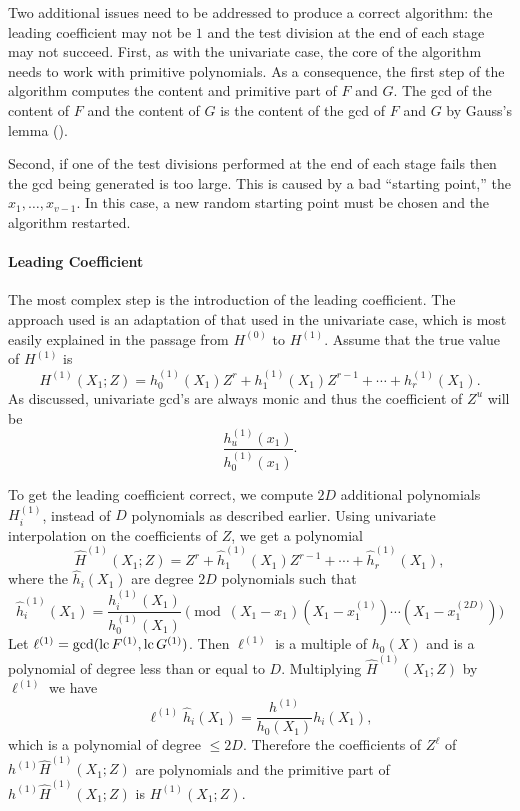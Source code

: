 \medskip
Two additional issues need to be addressed to produce a correct
algorithm: the leading coefficient may not be $1$ and the test
division at the end of each stage may not succeed.  First, as with the
univariate case, the core of the algorithm needs to work with
primitive polynomials.  As a consequence, the first step of the
algorithm computes the content and primitive part of $F$ and $G$.
The {\sc gcd} of the content of $F$ and the content of $G$ is the
content of the {\sc gcd} of $F$ and $G$ by Gauss's lemma
(). 

Second, if one of the test divisions performed at the end of each
stage fails then the {\sc gcd} being generated is too large.  This is
caused by a bad ``starting point,'' the $x_1, \ldots, x_{v-1}$.  In
this case, a new random starting point must be chosen and the algorithm
restarted.  

\paragraph{Leading Coefficient}

The most complex step is the introduction of the leading coefficient.
The approach used is an adaptation of that used in the univariate
case, which is most easily explained in the passage from $H^{(0)}$ to
$H^{(1)}$.  Assume that the true value of $H^{(1)}$ is
\[
H^{(1)}(X_1; Z) = h^{(1)}_0(X_1) Z^r + h^{(1)}_1(X_1) Z^{r-1} + 
  \cdots + h^{(1)}_r(X_1).
\]
As discussed, univariate {\sc gcd}'s are always monic and thus the
coefficient of $Z^u$ will be  
\[
\frac{h^{(1)}_{u}(x_1)}{h^{(1)}_0(x_1)}.
\]

To get the leading coefficient correct, we compute $2D$
additional polynomials $H^{(1)}_i$, instead of $D$ polynomials as
described earlier.  Using univariate interpolation on the coefficients
of $Z$, we get a polynomial
\[
\hat{H}^{(1)}(X_1; Z) = Z^r + \hat{h}^{(1)}_1(X_1)Z^{r-1} + \cdots +
\hat{h}^{(1)}_r(X_1),
\]
where the $\hat{h}_i(X_1)$ are degree $2D$ polynomials such that 
\[
\hat{h}^{(1)}_i(X_1) = \frac{h^{(1)}_i(X_1)}{h^{(1)}_0(X_1)} 
  \pmod{(X_1 - x_1)(X_1 - x^{(1)}_1) \cdots (X_1 - x^{(2D)}_1)}
\]
Let $\ell^{(1)} = \gcd(\operatorname{lc} F^{(1)}, \operatorname{lc} G^{(1)})$.  Then $\ell^{(1)}$ is a
multiple of $h_0(X)$ and is a polynomial of degree less than or equal
to $D$.  Multiplying $\hat{H}^{(1)}(X_1; Z)$ by $\ell^{(1)}$ we have
\[
\ell^{(1)} \hat{h}_i(X_1) = \frac{h^{(1)}}{h_0(X_1)} h_i(X_1),
\]
which is a polynomial of degree $\le 2D$.  Therefore the coefficients
of $Z^{\ell}$ of $h^{(1)} \hat{H}^{(1)}(X_1; Z)$ are polynomials and
the primitive part of $h^{(1)} \hat{H}^{(1)}(X_1; Z)$ is $H^{(1)}(X_1;
Z)$.


